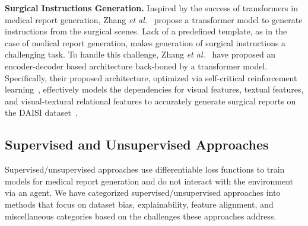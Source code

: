\documentclass[10pt,journal,compsoc]{IEEEtran}
\begin{document}

\textbf{{Surgical Instructions Generation.}}
Inspired by the success of transformers in medical report generation, Zhang \textit{et al.}~\cite{zhang2021surgical} propose a transformer model to generate instructions from the surgical scenes. Lack of a predefined template, as in the case of medical report generation, makes generation of surgical instructions a challenging task. To handle this challenge, Zhang \textit{et al.}~\cite{zhang2021surgical} have proposed an encoder-decoder based architecture back-boned by a transformer model. Specifically, their proposed architecture, optimized via self-critical reinforcement learning~\cite{rennie2017self}, effectively models the dependencies for visual features, textual features, and visual-textural relational features to accurately generate surgical reports on the DAISI dataset~\cite{rojas2020daisi}. 
 
\subsection{Supervised and Unsupervised Approaches}

Supervised/unsupervised approaches use differentiable loss functions to train models for medical report generation and do not interact with the environment via an agent. We have categorized supervised/unsupervised approaches into methods that focus on dataset bias, explainability, feature alignment, and miscellaneous categories based on the challenges these approaches address.

 
\end{document}

